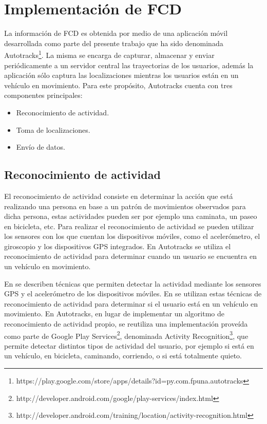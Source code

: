 \section{Implementación de FCD}
\label{floating-car-data}

La información de FCD es obtenida por medio de una aplicación móvil desarrollada como parte del presente trabajo que ha sido denominada Autotracks\footnote{https://play.google.com/store/apps/details?id=py.com.fpuna.autotracks}. La misma se encarga de capturar, almacenar y enviar periódicamente a un servidor central las trayectorias de los usuarios, además la aplicación sólo captura las localizaciones mientras los usuarios están en un vehículo en movimiento. Para este propósito, Autotracks cuenta con tres componentes principales: 
\begin{itemize}
	\item Reconocimiento de actividad.
	\item Toma de localizaciones.
	\item Envío de datos.
\end{itemize}

\subsection{Reconocimiento de actividad}
\label{reconocimiento_actividad}

El reconocimiento de actividad consiste en determinar la acción que está realizando una persona en base a un patrón de movimientos observados para dicha persona, estas actividades pueden ser por ejemplo una caminata, un paseo en bicicleta, etc. Para realizar el reconocimiento de actividad se pueden utilizar los sensores con los que cuentan los dispositivos móviles, como el acelerómetro, el giroscopio y los dispositivos GPS integrados. En Autotracks se utiliza el reconocimiento de actividad para determinar cuando un usuario se encuentra en un vehículo en movimiento.

En \citep{liao2006location,bao2004activity,ravi2005activity} se describen técnicas que permiten detectar la actividad mediante los sensores GPS y el acelerómetro de los dispositivos móviles. En \citep{thiagarajan2010cooperative} se utilizan estas técnicas de reconocimiento de actividad para determinar si el usuario está en un vehículo en movimiento. En Autotracks, en lugar de implementar un algoritmo de reconocimiento de actividad propio, se reutiliza una implementación proveída como parte de Google Play Services\footnote{http://developer.android.com/google/play-services/index.html}, denominada Activity Recognition\footnote{http://developer.android.com/training/location/activity-recognition.html}, que permite detectar distintos tipos de actividad del usuario, por ejemplo si está en un vehículo, en bicicleta, caminando, corriendo, o si está totalmente quieto.

